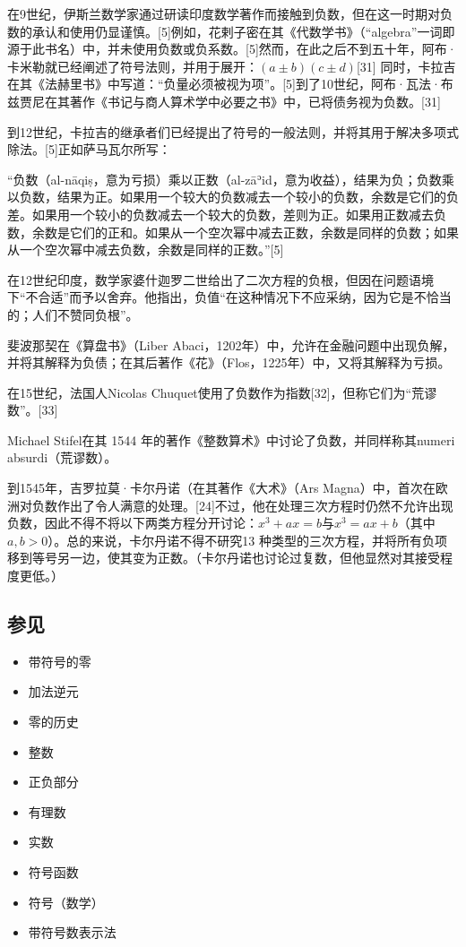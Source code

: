 在9世纪，伊斯兰数学家通过研读印度数学著作而接触到负数，但在这一时期对负数的承认和使用仍显谨慎。[5]例如，花剌子密在其《代数学书》（“algebra”一词即源于此书名）中，并未使用负数或负系数。[5]然而，在此之后不到五十年，阿布·卡米勒就已经阐述了符号法则，并用于展开：$(a \pm b)(c \pm d)$[31] 同时，卡拉吉在其《法赫里书》中写道：“负量必须被视为项”。[5]到了10世纪，阿布·瓦法·布兹贾尼在其著作《书记与商人算术学中必要之书》中，已将债务视为负数。[31]

到12世纪，卡拉吉的继承者们已经提出了符号的一般法则，并将其用于解决多项式除法。[5]正如萨马瓦尔所写：

“负数（al-nāqiṣ，意为亏损）乘以正数（al-zāʾid，意为收益），结果为负；负数乘以负数，结果为正。如果用一个较大的负数减去一个较小的负数，余数是它们的负差。如果用一个较小的负数减去一个较大的负数，差则为正。如果用正数减去负数，余数是它们的正和。如果从一个空次幂中减去正数，余数是同样的负数；如果从一个空次幂中减去负数，余数是同样的正数。”[5]

在12世纪印度，数学家婆什迦罗二世给出了二次方程的负根，但因在问题语境下“不合适”而予以舍弃。他指出，负值“在这种情况下不应采纳，因为它是不恰当的；人们不赞同负根”。

斐波那契在《算盘书》（Liber Abaci，1202年）中，允许在金融问题中出现负解，并将其解释为负债；在其后著作《花》（Flos，1225年）中，又将其解释为亏损。

在15世纪，法国人Nicolas Chuquet使用了负数作为指数[32]，但称它们为“荒谬数”。[33]

Michael Stifel在其 1544 年的著作《整数算术》中讨论了负数，并同样称其numeri absurdi（荒谬数）。

到1545年，吉罗拉莫·卡尔丹诺（在其著作《大术》（Ars Magna）中，首次在欧洲对负数作出了令人满意的处理。[24]不过，他在处理三次方程时仍然不允许出现负数，因此不得不将以下两类方程分开讨论：$x^{3} + ax = b$与$x^{3} = ax + b$（其中 $a, b > 0$）。总的来说，卡尔丹诺不得不研究13 种类型的三次方程，并将所有负项移到等号另一边，使其变为正数。（卡尔丹诺也讨论过复数，但他显然对其接受程度更低。）
\subsection{参见}
\begin{itemize}
\item 带符号的零
\item 加法逆元
\item 零的历史
\item 整数
\item 正负部分
\item 有理数
\item 实数
\item 符号函数
\item 符号（数学）
\item 带符号数表示法
\end{itemize}

